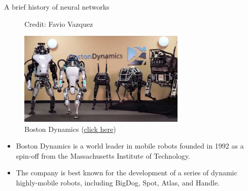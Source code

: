 \begin{vbframe}{A brief history of neural networks}
\begin{figure}
\centering
{}
\tiny{Credit: Favio Vazquez}
\framebreak

\end{figure}
\framebreak

\begin{figure}
\centering
\includegraphics[width=8cm]{figure/bostondynamic.png}
\caption{Boston Dynamics (\href{https://www.youtube.com/watch?v=fUyU3lKzoio&ab_channel=BostonDynamics}{click here})}
\end{figure}
\footnotesize
\begin{itemize}
\item Boston Dynamics is a world leader in mobile robots founded in 1992 as a spin-off from the Massachusetts Institute of Technology.
\vspace{.1cm}
\item The company is best known for the development of a series of dynamic highly-mobile robots, including BigDog, Spot, Atlas, and Handle.
\end{itemize}
\framebreak


\end{vbframe}
